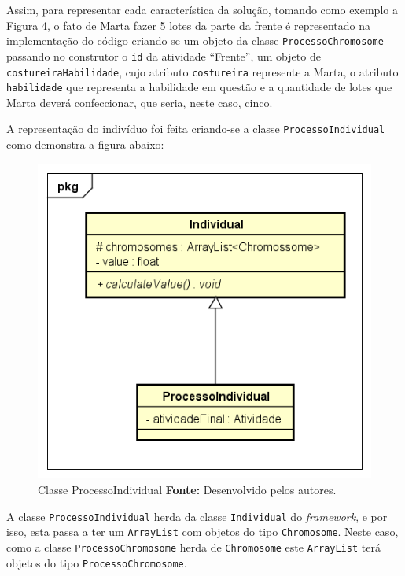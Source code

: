 \par Assim, para representar cada característica da solução, tomando como exemplo a Figura 4, 
o fato de Marta fazer 5 lotes da parte da frente é representado na implementação
do código criando se um objeto da classe \texttt{ProcessoChromosome} passando no
construtor o \texttt{id} da atividade ``Frente'', um objeto de
\texttt{costureiraHabilidade}, cujo atributo \texttt{costureira} represente a
Marta, o atributo \texttt{habilidade} que representa a habilidade em questão e a
quantidade de lotes que Marta deverá confeccionar, que seria, neste caso, cinco.

\par A representação do indivíduo foi feita criando-se a classe \texttt{ProcessoIndividual} como demonstra a figura abaixo:


\begin{figure}[h!]
	\centerline{\includegraphics[scale=0.9]{./imagens/class_individual.png}}
	\caption[Classe CostureiraHabilidade]
	{Classe ProcessoIndividual \textbf{Fonte:} Desenvolvido pelos autores.}
	\label{fig:exemplo1}
\end{figure}

\par A classe \texttt{ProcessoIndividual} herda da classe \texttt{Individual} do
\textit{framework}, e por isso, esta passa a ter um \texttt{ArrayList} com
objetos do tipo \texttt{Chromosome}. Neste caso, como a classe \texttt{ProcessoChromosome} herda de \texttt{Chromosome} 
este \texttt{ArrayList} terá objetos do tipo \texttt{ProcessoChromosome}.

